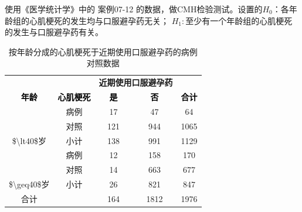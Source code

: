 \documentclass[
]{article}
\begin{document}
使用《医学统计学》中的 案例07-12 的数据，做CMH检验测试。设置的\(H_0\)：各年龄组的心肌梗死的发生均与口服避孕药无关；
\(H_1:\)至少有一个年龄组的心肌梗死的发生与口服避孕药有关。

\begin{table}

\caption{\label{tab:chisqtab9}按年龄分成的心肌梗死于近期使用口服避孕药的病例对照数据}
\centering
\begin{tabular}[t]{ccccc}
\toprule
\multicolumn{1}{c}{\textbf{ }} & \multicolumn{1}{c}{\textbf{ }} & \multicolumn{2}{c}{\textbf{近期使用口服避孕药}} & \multicolumn{1}{c}{\textbf{ }} \\
\cmidrule(l{3pt}r{3pt}){3-4}
\textcolor{black}{\textbf{年龄}} & \textcolor{black}{\textbf{心肌梗死}} & \textcolor{black}{\textbf{是}} & \textcolor{black}{\textbf{否}} & \textcolor{black}{\textbf{合计}}\\
\midrule
 & 病例 & 17 & 47 & 64\\

 & 对照 & 121 & 944 & 1065\\

\multirow{-3}{*}{\centering\arraybackslash \$\textbackslash{}lt40\$岁} & 小计 & 138 & 991 & 1129\\
\cmidrule{1-5}
 & 病例 & 12 & 158 & 170\\
\cline{2-3}

 & 对照 & 14 & 663 & 677\\

\multirow{-3}{*}{\centering\arraybackslash \$\textbackslash{}geq40\$岁} & 小计 & 26 & 821 & 847\\
\cmidrule{1-5}
合计 &  & 164 & 1812 & 1976\\
\bottomrule
\end{tabular}
\end{table}
\end{document}
